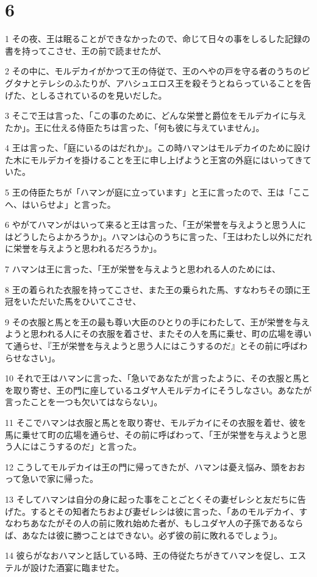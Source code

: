 \chapter{6}

\par 1 その夜、王は眠ることができなかったので、命じて日々の事をしるした記録の書を持ってこさせ、王の前で読ませたが、
\par 2 その中に、モルデカイがかつて王の侍従で、王のへやの戸を守る者のうちのビグタナとテレシのふたりが、アハシュエロス王を殺そうとねらっていることを告げた、としるされているのを見いだした。
\par 3 そこで王は言った、「この事のために、どんな栄誉と爵位をモルデカイに与えたか」。王に仕える侍臣たちは言った、「何も彼に与えていません」。
\par 4 王は言った、「庭にいるのはだれか」。この時ハマンはモルデカイのために設けた木にモルデカイを掛けることを王に申し上げようと王宮の外庭にはいってきていた。
\par 5 王の侍臣たちが「ハマンが庭に立っています」と王に言ったので、王は「ここへ、はいらせよ」と言った。
\par 6 やがてハマンがはいって来ると王は言った、「王が栄誉を与えようと思う人にはどうしたらよかろうか」。ハマンは心のうちに言った、「王はわたし以外にだれに栄誉を与えようと思われるだろうか」。
\par 7 ハマンは王に言った、「王が栄誉を与えようと思われる人のためには、
\par 8 王の着られた衣服を持ってこさせ、また王の乗られた馬、すなわちその頭に王冠をいただいた馬をひいてこさせ、
\par 9 その衣服と馬とを王の最も尊い大臣のひとりの手にわたして、王が栄誉を与えようと思われる人にその衣服を着させ、またその人を馬に乗せ、町の広場を導いて通らせ、『王が栄誉を与えようと思う人にはこうするのだ』とその前に呼ばわらせなさい」。
\par 10 それで王はハマンに言った、「急いであなたが言ったように、その衣服と馬とを取り寄せ、王の門に座しているユダヤ人モルデカイにそうしなさい。あなたが言ったことを一つも欠いてはならない」。
\par 11 そこでハマンは衣服と馬とを取り寄せ、モルデカイにその衣服を着せ、彼を馬に乗せて町の広場を通らせ、その前に呼ばわって、「王が栄誉を与えようと思う人にはこうするのだ」と言った。
\par 12 こうしてモルデカイは王の門に帰ってきたが、ハマンは憂え悩み、頭をおおって急いで家に帰った。
\par 13 そしてハマンは自分の身に起った事をことごとくその妻ゼレシと友だちに告げた。するとその知者たちおよび妻ゼレシは彼に言った、「あのモルデカイ、すなわちあなたがその人の前に敗れ始めた者が、もしユダヤ人の子孫であるならば、あなたは彼に勝つことはできない。必ず彼の前に敗れるでしょう」。
\par 14 彼らがなおハマンと話している時、王の侍従たちがきてハマンを促し、エステルが設けた酒宴に臨ませた。

